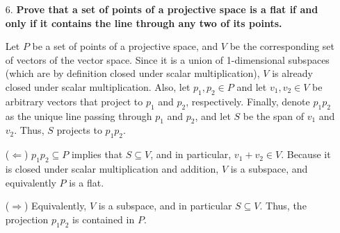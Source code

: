 \documentclass[a4paper,12pt]{article}
\begin{document}
\begin{enumerate}
    \item[6.]
        \boldmath
        \textbf{Prove that a set of points of a projective space is a flat if and only if it contains the line through any two of its points.} \par
        \unboldmath
        Let $P$ be a set of points of a projective space, and $V$ be the corresponding set of vectors of the vector space. Since it is a union of 1-dimensional subspaces (which are by definition closed under scalar multiplication), $V$ is already closed under scalar multiplication. Also, let $p_1, p_2 \in P$ and let $v_1, v_2 \in V$ be arbitrary vectors that project to $p_1$ and $p_2$, respectively. Finally, denote $p_1 p_2$ as the unique line passing through $p_1$ and $p_2$, and let $S$ be the span of $v_1$ and $v_2$. Thus, $S$ projects to $p_1 p_2$. \par
        ($\Leftarrow$) \iffalse Let $v_1, v_2 \in V$. If they are linearly dependent, then they are projected to the same point in $P$, and $v_1 + v_2$ is also, which implies that $v_1 + v_2 \in V$. Otherwise, let $p_1, p_2$ be the projected points of $v_1, v_2$, respectively, and let $p_1 p_2$ denote the unique line passing through these points. The space spanned by $v_1$ and $v_2$ projects to $p_1 p_2$. \fi $p_1 p_2 \subseteq P$ implies that $S \subseteq V$, and in particular, $v_1 + v_2 \in V$. Because it is closed under scalar multiplication and addition, $V$ is a subspace, and equivalently $P$ is a flat. \par
        ($\Rightarrow$) Equivalently, $V$ is a subspace, and in particular $S \subseteq V$. Thus, the projection $p_1 p_2$ is contained in $P$.
\end{enumerate}
\end{document}
